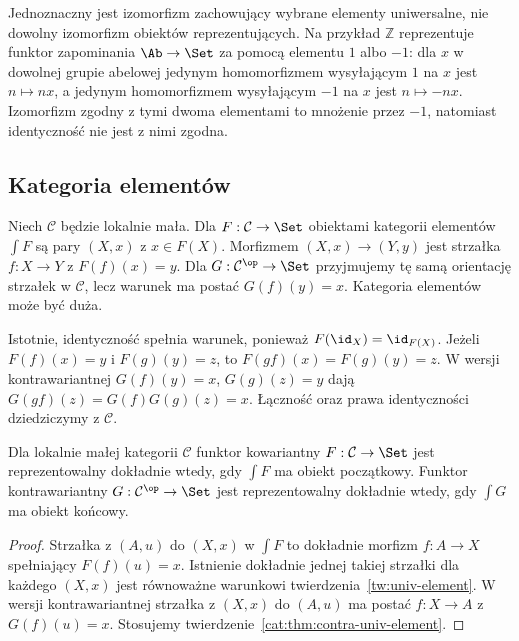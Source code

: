 \begin{uwaga}
Jednoznaczny jest izomorfizm zachowujący wybrane elementy uniwersalne, nie dowolny izomorfizm obiektów reprezentujących. Na przykład $\mathbb Z$ reprezentuje funktor zapominania $\Ab\to\Set$ za pomocą elementu $1$ albo $-1$: dla $x$ w dowolnej grupie abelowej jedynym homomorfizmem wysyłającym $1$ na $x$ jest $n\mapsto nx$, a jedynym homomorfizmem wysyłającym $-1$ na $x$ jest $n\mapsto -nx$. Izomorfizm zgodny z tymi dwoma elementami to mnożenie przez $-1$, natomiast identyczność nie jest z nimi zgodna.
\end{uwaga}

\subsection{Kategoria elementów}

\begin{definicja}\label{cat:def:elements}
Niech $\mathcal C$ będzie lokalnie mała. Dla $F:\mathcal C\to\Set$ obiektami kategorii elementów $\int F$ są pary $(X,x)$ z $x\in F(X)$. Morfizmem $(X,x)\to(Y,y)$ jest strzałka $f:X\to Y$ z $F(f)(x)=y$. Dla $G:\mathcal C^{\op}\to\Set$ przyjmujemy tę samą orientację strzałek w $\mathcal C$, lecz warunek ma postać $G(f)(y)=x$. Kategoria elementów może być duża.
\end{definicja}

Istotnie, identyczność spełnia warunek, ponieważ $F(\id_X)=\id_{F(X)}$. Jeżeli $F(f)(x)=y$ i $F(g)(y)=z$, to $F(gf)(x)=F(g)(y)=z$. W wersji kontrawariantnej $G(f)(y)=x$, $G(g)(z)=y$ dają $G(gf)(z)=G(f)G(g)(z)=x$. Łączność oraz prawa identyczności dziedziczymy z $\mathcal C$.

\begin{stwierdzenie}\label{cat:prop:elements-representable}
Dla lokalnie małej kategorii $\mathcal C$ funktor kowariantny $F:\mathcal C\to\Set$ jest reprezentowalny dokładnie wtedy, gdy $\int F$ ma obiekt początkowy. Funktor kontrawariantny $G:\mathcal C^{\op}\to\Set$ jest reprezentowalny dokładnie wtedy, gdy $\int G$ ma obiekt końcowy.
\end{stwierdzenie}
\begin{proof}
Strzałka z $(A,u)$ do $(X,x)$ w $\int F$ to dokładnie morfizm $f:A\to X$ spełniający $F(f)(u)=x$. Istnienie dokładnie jednej takiej strzałki dla każdego $(X,x)$ jest równoważne warunkowi twierdzenia~\ref{tw:univ-element}. W wersji kontrawariantnej strzałka z $(X,x)$ do $(A,u)$ ma postać $f:X\to A$ z $G(f)(u)=x$. Stosujemy twierdzenie~\ref{cat:thm:contra-univ-element}.
\end{proof}

